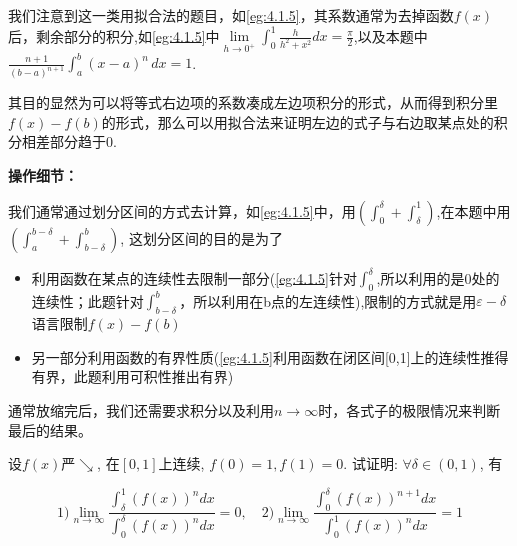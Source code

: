 \documentclass[lang=cn,newtx,10pt,scheme=chinese]{elegantbook}
\begin{document}
\begin{note}
    我们注意到这一类用拟合法的题目，如\ref{eg:4.1.5}，其系数通常为去掉函数$f(x)$后，剩余部分的积分,如\ref{eg:4.1.5}中$\lim\limits_{h \to 0^+} \int_{0}^{1} \frac{h}{h^2+x^2}dx = \frac{\pi}{2}$,以及本题中$\frac{n+1}{(b-a)^{n+1}} \int_a^b (x-a)^n \,dx = 1$.
    
    其目的显然为可以将等式右边项的系数凑成左边项积分的形式，从而得到积分里$f(x) - f(b)$的形式，那么可以用拟合法来证明左边的式子与右边取某点处的积分相差部分趋于0.

    \textbf{操作细节：}
    
    我们通常通过划分区间的方式去计算，如\ref{eg:4.1.5}中，用$\left(\int_{0}^{\delta} + \int_{\delta}^{1}\right)$,在本题中用$\left(\int_{a}^{b-\delta} + \int_{b-\delta}^{b}\right)$,
    这划分区间的目的是为了
    \begin{itemize}
        \item 利用函数在某点的连续性去限制一部分(\ref{eg:4.1.5}针对$\int_{0}^{\delta}$,所以利用的是0处的连续性；此题针对$\int_{b-\delta}^{b}$，所以利用在b点的左连续性),限制的方式就是用$\varepsilon - \delta$语言限制$f(x) - f(b)$
        \item 另一部分利用函数的有界性质(\ref{eg:4.1.5}利用函数在闭区间[0,1]上的连续性推得有界，此题利用可积性推出有界)
    \end{itemize}
    通常放缩完后，我们还需要求积分以及利用$n \to \infty$时，各式子的极限情况来判断最后的结果。
\end{note}

\begin{example}
设$f(x)$严$\searrow$, 在$[0,1]$上连续, $f(0)=1, f(1)=0$. 试证明: $\forall \delta \in (0,1)$, 有

 $$1) \lim\limits_{n \to \infty} \frac{\int_{\delta}^{1} (f(x))^n dx}{\int_{0}^{\delta} (f(x))^n dx} = 0,\quad 2)\lim\limits_{n \to \infty} \frac{\int_{0}^{\delta} (f(x))^{n+1} dx}{\int_{0}^{1} (f(x))^n dx} = 1$$
\end{example}
\end{document}

